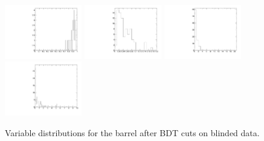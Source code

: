 \begin{figure}
  \includegraphics[width=0.3\textwidth]{Figures/AfterBDTCut_iso_BarrelUnblinded.pdf}
  \includegraphics[width=0.3\textwidth]{Figures/AfterBDTCut_docatrk_BarrelUnblinded.pdf}
  \includegraphics[width=0.3\textwidth]{Figures/AfterBDTCut_closetrk_BarrelUnblinded.pdf}
  \includegraphics[width=0.3\textwidth]{Figures/AfterBDTCut_chi2dof_BarrelUnblinded.pdf}
  \caption{Variable distributions for the barrel after BDT cuts on blinded data.}
  \label{fig:massPlotUnblinded}
\end{figure}


